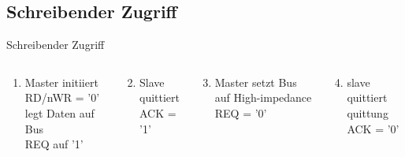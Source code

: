   \subsection{Schreibender Zugriff}
  \begin{frame} {Schreibender Zugriff}
    \begin{columns}
        \begin{block} {}
          \begin{enumerate}
            \setcounter{enumi}{0}
            \item Master initiiert RD/nWR = '0'\\
                  legt Daten auf Bus \\
                  REQ auf '1'
          \end{enumerate}
        \end{block}
        \begin{block} {}
          \begin{enumerate}
            \setcounter{enumi}{1}
            \item Slave quittiert\\
                  ACK = '1'
          \end{enumerate}
        \end{block}
        \begin{block} {}
          \begin{enumerate}
            \setcounter{enumi}{2}
            \item Master setzt Bus auf High-impedance\\
                  REQ = '0'
          \end{enumerate}
        \end{block}
        \begin{block} {}
          \begin{enumerate}
            \setcounter{enumi}{3}
            \item slave quittiert quittung\\
                  ACK = '0'
          \end{enumerate}
        \end{block}
    \end{columns}
  \end{frame}

